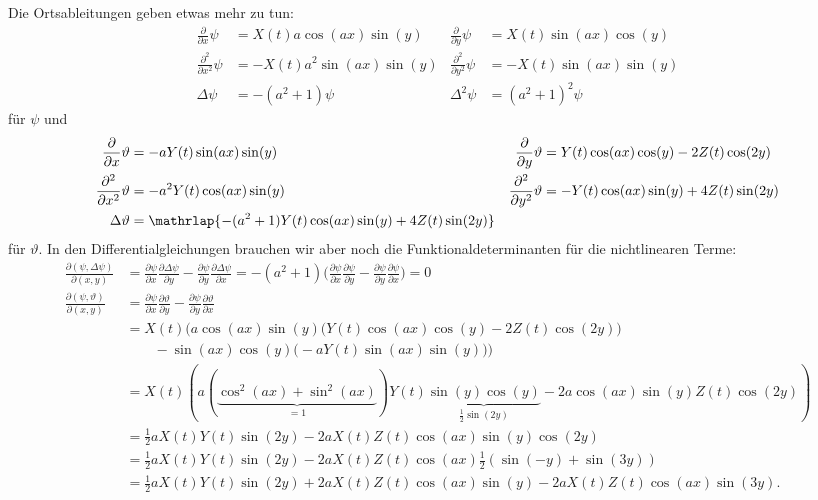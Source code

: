 Die Ortsableitungen geben etwas mehr zu tun:
\begin{align*}
\frac{\partial}{\partial x}\psi
&=
X(t)a\cos(ax)\sin(y)
&
\frac{\partial}{\partial y}\psi
&=
X(t)\sin(ax)\cos(y)
\\
\frac{\partial^2}{\partial x^2}\psi
&=
-X(t)a^2\sin(ax)\sin(y)
&
\frac{\partial^2}{\partial y^2}\psi
&=
-X(t)\sin(ax)\sin(y)
\\
\Delta\psi
&=-(a^2+1)\psi
&
\Delta^2 \psi
&=
(a^2+1)^2\psi
\end{align*}
für $\psi$ und
\begin{align*}
\frac{\partial}{\partial x}\vartheta
&=
-aY(t) \sin(ax) \sin(y)
&
\frac{\partial}{\partial y}\vartheta
&=
Y(t) \cos(ax) \cos(y) - 2 Z(t)\cos(2y)
\\
\frac{\partial^2}{\partial x^2}\vartheta
&=
-a^2Y(t) \cos(ax) \sin(y)
&
\frac{\partial^2}{\partial y^2}\vartheta
&=
-Y(t) \cos(ax) \sin(y)
+4Z(t)\sin(2y)
\\
\Delta\vartheta
&=\mathrlap{-(a^2+1)Y(t)\cos(ax)\sin(y)+4Z(t)\sin(2y)}
\end{align*}
für $\vartheta$.
In den Differentialgleichungen brauchen wir aber noch die
Funktionaldeterminanten für die nichtlinearen Terme:
\begin{align*}
\frac{\partial(\psi,\Delta\psi)}{\partial(x,y)}
&=
\frac{\partial\psi}{\partial x} \frac{\partial\Delta\psi}{\partial y}
-
\frac{\partial\psi}{\partial y} \frac{\partial\Delta\psi}{\partial x}
=
-(a^2+1)\biggl(
\frac{\partial\psi}{\partial x} \frac{\partial\psi}{\partial y}
-
\frac{\partial\psi}{\partial y} \frac{\partial\psi}{\partial x}
\biggr)
=0
\\
\frac{\partial(\psi,\vartheta)}{\partial(x,y)}
&=
\frac{\partial\psi}{\partial x} \frac{\partial\vartheta}{\partial y}
-
\frac{\partial\psi}{\partial y} \frac{\partial\vartheta}{\partial x}
\\
&=
X(t)\biggl(
a \cos(ax)\sin(y)
\bigl(Y(t) \cos(ax) \cos(y) - 2Z(t)\cos(2y)\bigr)
\\
&\qquad
-
\sin(ax)\cos(y)
\bigl(-aY(t) \sin(ax) \sin(y) \bigr)
\biggr)
\\
&=
X(t)(a(\underbrace{\cos^2(ax)+\sin^2(ax)}_{\displaystyle=1})
Y(t)\underbrace{\sin(y)\cos(y)}_{\displaystyle{\textstyle\frac12}\sin(2y)}-2a\cos(ax)\sin(y)Z(t)\cos(2y))
\\
&=
\frac12aX(t)Y(t) \sin(2y)
-
2a X(t)Z(t) \cos(ax)\sin(y)\cos(2y)
\\
&=
\frac12aX(t)Y(t) \sin(2y)
-
2a X(t)Z(t) \cos(ax)\frac12(\sin(-y)+\sin(3y))
\\
&=
\frac12aX(t)Y(t) \sin(2y)
+
2aX(t)Z(t) \cos(ax)\sin(y)
-
2aX(t)Z(t) \cos(ax)\sin(3y).
\end{align*}

